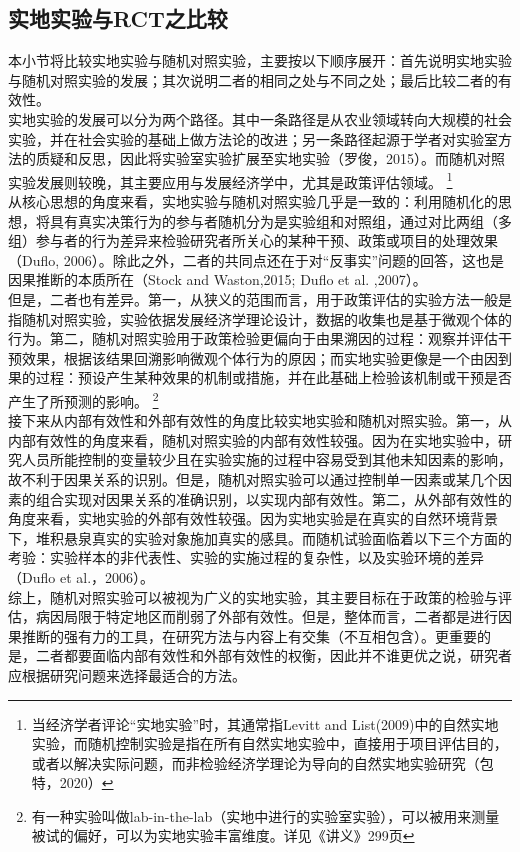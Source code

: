 \documentclass[a4paper]{article}
\begin{document}
	\subsection{实地实验与RCT之比较}
	本小节将比较实地实验与随机对照实验，主要按以下顺序展开：首先说明实地实验与随机对照实验的发展；其次说明二者的相同之处与不同之处；最后比较二者的有效性。
	\\[3pt]
	\indent
	实地实验的发展可以分为两个路径。其中一条路径是从农业领域转向大规模的社会实验，并在社会实验的基础上做方法论的改进；另一条路径起源于学者对实验室方法的质疑和反思，因此将实验室实验扩展至实地实验（罗俊，2015）。而随机对照实验发展则较晚，其主要应用与发展经济学中，尤其是政策评估领域。
	\footnote{当经济学者评论“实地实验”时，其通常指Levitt and List(2009)中的自然实地实验，而随机控制实验是指在所有自然实地实验中，直接用于项目评估目的，或者以解决实际问题，而非检验经济学理论为导向的自然实地实验研究（包特，2020）}
	\\[3pt]
	\indent
	从核心思想的角度来看，实地实验与随机对照实验几乎是一致的：利用随机化的思想，将具有真实决策行为的参与者随机分为是实验组和对照组，通过对比两组（多组）参与者的行为差异来检验研究者所关心的某种干预、政策或项目的处理效果（Duflo, 2006）。除此之外，二者的共同点还在于对“反事实”问题的回答，这也是因果推断的本质所在（Stock and Waston,2015; Duflo et al. ,2007）。
	\\[3pt]
	\indent
	但是，二者也有差异。第一，从狭义的范围而言，用于政策评估的实验方法一般是指随机对照实验，实验依据发展经济学理论设计，数据的收集也是基于微观个体的行为。第二，随机对照实验用于政策检验更偏向于由果溯因的过程：观察并评估干预效果，根据该结果回溯影响微观个体行为的原因；而实地实验更像是一个由因到果的过程：预设产生某种效果的机制或措施，并在此基础上检验该机制或干预是否产生了所预测的影响。
	\footnote{有一种实验叫做lab-in-the-lab（实地中进行的实验室实验），可以被用来测量被试的偏好，可以为实地实验丰富维度。详见《讲义》299页}
	\\[3pt]
	\indent
	接下来从内部有效性和外部有效性的角度比较实地实验和随机对照实验。第一，从内部有效性的角度来看，随机对照实验的内部有效性较强。因为在实地实验中，研究人员所能控制的变量较少且在实验实施的过程中容易受到其他未知因素的影响，故不利于因果关系的识别。但是，随机对照实验可以通过控制单一因素或某几个因素的组合实现对因果关系的准确识别，以实现内部有效性。第二，从外部有效性的角度来看，实地实验的外部有效性较强。因为实地实验是在真实的自然环境背景下，堆积悬泉真实的实验对象施加真实的感具。而随机试验面临着以下三个方面的考验：实验样本的非代表性、实验的实施过程的复杂性，以及实验环境的差异（Duflo et al.，2006）。
	\\[3pt]
	\indent
	综上，随机对照实验可以被视为广义的实地实验，其主要目标在于政策的检验与评估，病因局限于特定地区而削弱了外部有效性。但是，整体而言，二者都是进行因果推断的强有力的工具，在研究方法与内容上有交集（不互相包含）。更重要的是，二者都要面临内部有效性和外部有效性的权衡，因此并不谁更优之说，研究者应根据研究问题来选择最适合的方法。
	

	
	
\end{document}

